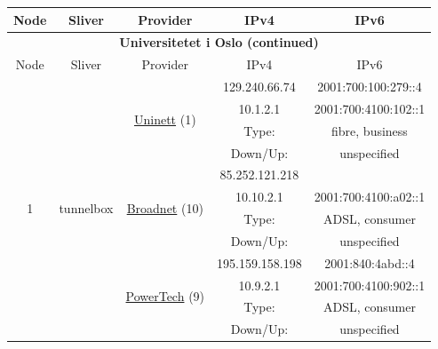 \begin{small}
\begin{center}
\begin{longtable}{|c|c|c|c|c|c|c|c|}
 \multicolumn{2}{|p{8em}|}{Node} & \multicolumn{2}{|p{8em}|}{Sliver} & \multicolumn{2}{|p{8em}|}{Provider} & IPv4 & IPv6 \\ \hline
\endfirsthead
\hline
 \multicolumn{8}{|c|}{\textbf{Universitetet i Oslo (continued)}} \\ \hline
 \multicolumn{2}{|p{8em}|}{Node} & \multicolumn{2}{|p{8em}|}{Sliver} & \multicolumn{2}{|p{8em}|}{Provider} & IPv4 & IPv6 \\ \hline
\endhead
 \multirow{12}{*}{\tiny{1}} & \multicolumn{3}{|c|}{\multirow{12}{*}{\tiny{tunnelbox}}} & \multicolumn{2}{|c|}{\multirow{4}{*}{\tiny{\href{https://www.uninett.no}{Uninett} (1)}}} & \tiny{129.240.66.74} & \tiny{2001:700:100:279::4} \\* \cline{7-7}\cline{8-8}
  & \multicolumn{3}{|c|}{} & \multicolumn{2}{|c|}{} & \tiny{10.1.2.1} & \tiny{2001:700:4100:102::1} \\* \cline{7-7}\cline{8-8}
  & \multicolumn{3}{|c|}{} & \multicolumn{2}{|c|}{} & Type: & fibre, business \\* \cline{7-7}\cline{8-8}
  & \multicolumn{3}{|c|}{} & \multicolumn{2}{|c|}{} & Down/Up:  & unspecified \\* \cline{5-5}\cline{6-6}\cline{7-7}\cline{8-8}
  & \multicolumn{3}{|c|}{} & \multicolumn{2}{|c|}{\multirow{4}{*}{\tiny{\href{https://www.broadnet.no}{Broadnet} (10)}}} & \tiny{85.252.121.218} & \frownie{} \\* \cline{7-7}\cline{8-8}
  & \multicolumn{3}{|c|}{} & \multicolumn{2}{|c|}{} & \tiny{10.10.2.1} & \tiny{2001:700:4100:a02::1} \\* \cline{7-7}\cline{8-8}
  & \multicolumn{3}{|c|}{} & \multicolumn{2}{|c|}{} & Type: & ADSL, consumer \\* \cline{7-7}\cline{8-8}
  & \multicolumn{3}{|c|}{} & \multicolumn{2}{|c|}{} & Down/Up:  & unspecified \\* \cline{5-5}\cline{6-6}\cline{7-7}\cline{8-8}
  & \multicolumn{3}{|c|}{} & \multicolumn{2}{|c|}{\multirow{4}{*}{\tiny{\href{http://www.powertech.no}{PowerTech} (9)}}} & \tiny{195.159.158.198} & \tiny{2001:840:4abd::4} \\* \cline{7-7}\cline{8-8}
  & \multicolumn{3}{|c|}{} & \multicolumn{2}{|c|}{} & \tiny{10.9.2.1} & \tiny{2001:700:4100:902::1} \\* \cline{7-7}\cline{8-8}
  & \multicolumn{3}{|c|}{} & \multicolumn{2}{|c|}{} & Type: & ADSL, consumer \\* \cline{7-7}\cline{8-8}
  & \multicolumn{3}{|c|}{} & \multicolumn{2}{|c|}{} & Down/Up:  & unspecified \\ \hline

\end{longtable}
\end{center}
\end{small}
